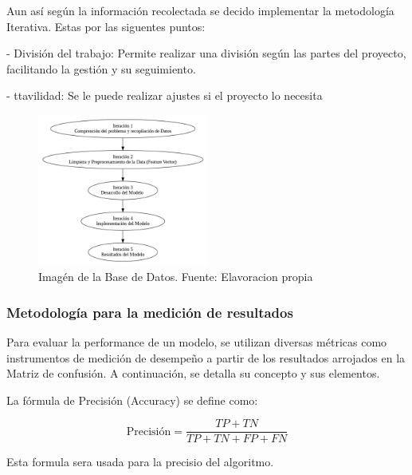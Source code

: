 Aun así según la información recolectada se decido implementar la metodología Iterativa. Estas por las siguentes puntos:

- División del trabajo: Permite realizar una división según las partes del proyecto, facilitando la gestión y su seguimiento.

- ttavilidad: Se le puede realizar ajustes si el proyecto lo necesita

\begin{figure}[h]
	\begin{center}
		\includegraphics[width=0.5\textwidth]{3/figures/metodologia.png}
		\caption{Imagén de la Base de Datos. Fuente: Elavoracion propia}
		\label{1:fig 19}
	\end{center}
\end{figure}



	






\subsubsection{Metodología para la medición de resultados}

Para evaluar la performance de un modelo, se utilizan diversas métricas como instrumentos de medición de desempeño a partir de los resultados arrojados en la Matriz de confusión. A continuación, se detalla su concepto y sus elementos.


La fórmula de Precisión (Accuracy) se define como:
 
\begin{equation}
	\text{Precisión} = \frac{TP + TN}{TP + TN + FP + FN}
\end{equation}

Esta formula sera usada para la precisio del algoritmo.





